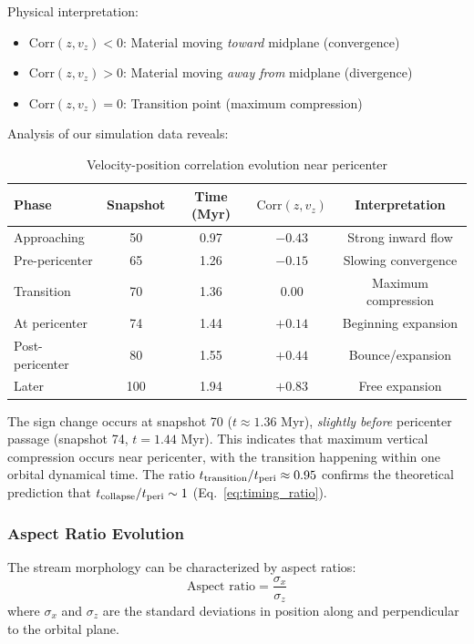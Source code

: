 \documentclass[twocolumn,amsmath,amssymb,prd,superscriptaddress,nofootinbib]{revtex4-2}
\begin{document}
Physical interpretation:
\begin{itemize}
    \item $\text{Corr}(z, v_z) < 0$: Material moving \textit{toward} midplane (convergence)
    \item $\text{Corr}(z, v_z) > 0$: Material moving \textit{away from} midplane (divergence)
    \item $\text{Corr}(z, v_z) = 0$: Transition point (maximum compression)
\end{itemize}

Analysis of our simulation data reveals:

\begin{table}[h]
\centering
\caption{Velocity-position correlation evolution near pericenter}
\label{tab:velocity_correlation}
\begin{tabular}{lcccc}
\toprule
Phase & Snapshot & Time (Myr) & $\text{Corr}(z, v_z)$ & Interpretation \\
\midrule
Approaching & 50 & 0.97 & $-0.43$ & Strong inward flow \\
Pre-pericenter & 65 & 1.26 & $-0.15$ & Slowing convergence \\
Transition & 70 & 1.36 & $0.00$ & Maximum compression \\
At pericenter & 74 & 1.44 & $+0.14$ & Beginning expansion \\
Post-pericenter & 80 & 1.55 & $+0.44$ & Bounce/expansion \\
Later & 100 & 1.94 & $+0.83$ & Free expansion \\
\bottomrule
\end{tabular}
\end{table}

The sign change occurs at snapshot 70 ($t \approx 1.36$ Myr), \textit{slightly before} pericenter passage (snapshot 74, $t = 1.44$ Myr). This indicates that maximum vertical compression occurs near pericenter, with the transition happening within one orbital dynamical time. The ratio $t_{\rm transition}/t_{\rm peri} \approx 0.95$ confirms the theoretical prediction that $t_{\rm collapse}/t_{\rm peri} \sim 1$ (Eq.~\ref{eq:timing_ratio}).

\subsubsection{Aspect Ratio Evolution}

The stream morphology can be characterized by aspect ratios:
\begin{equation}
    \text{Aspect ratio} = \frac{\sigma_x}{\sigma_z}
\end{equation}
where $\sigma_x$ and $\sigma_z$ are the standard deviations in position along and perpendicular to the orbital plane.
\end{document}
